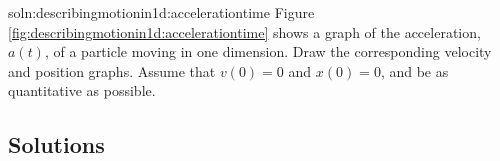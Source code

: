 \begin{problem}{soln:describingmotionin1d:accelerationtime} {\label{prob:describingmotionin1d:accelerationtime}Figure \ref{fig:describingmotionin1d:accelerationtime} shows a graph of the acceleration, $a(t)$, of a particle moving in one dimension. Draw the corresponding velocity and position graphs. Assume that $v(0)=0$ and $x(0)=0$, and be as quantitative as possible.}
\end{problem}

\newpage
\subsection{Solutions}
